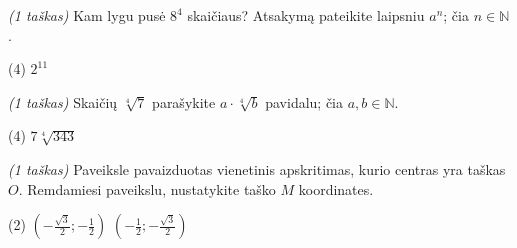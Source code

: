 \documentclass[a4paper]{article}
\begin{document}
\begin{enumerate}
      \item \textit{(1 taškas)} Kam lygu pusė $8^4$ skaičiaus? Atsakymą
            pateikite laipsniu $a^n$; čia $n \in \mathbb{N}$.
            \begin{tasks}[item-format={\normalfont}, after-item-skip=2mm,
                        label=\Alph*, label-format={\bfseries}](4)
                  \task $2^{11}$
            \end{tasks}
      \item \textit{(1 taškas)} Skaičių $\sqrt[4]{7}$ parašykite
            $a\cdot\sqrt[4]{b}$ pavidalu; čia $a, b \in \mathbb{N}$.
            \begin{tasks}[item-format={\normalfont}, after-item-skip=2mm,
                        label=\Alph*, label-format={\bfseries}](4)
                  \task $7\sqrt[4]{343}$
            \end{tasks}

            \begin{minipage}[t]{0.725\linewidth}
                  \item \textit{(1 taškas)} Paveiksle pavaizduotas vienetinis
                  apskritimas, kurio centras yra taškas $O$. Remdamiesi
                  paveikslu, nustatykite
                  taško $M$ koordinates.
                  \vspace{2mm}
                  \begin{tasks}[item-format={\normalfont},
                              after-item-skip=3mm,
                              label=\Alph*), label-format={\bfseries},
                              column-sep=10pt](2)
                        \task $(-\frac{\sqrt{3}}{2};-\frac{1}{2})$
                        \task $(-\frac{1}{2};-\frac{\sqrt{3}}{2})$
                  \end{tasks}

            \end{minipage}
            \begin{minipage}[t]{0.25\linewidth}
\end{minipage}
\end{enumerate}
\end{document}
